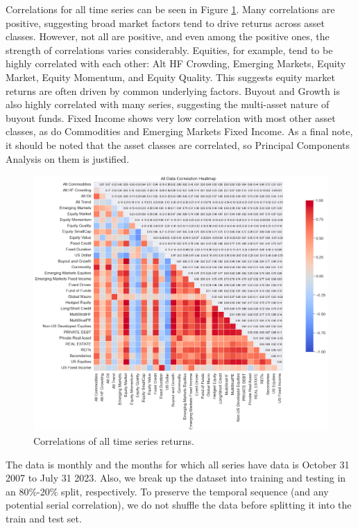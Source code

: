 \documentclass{ledger}
\begin{document}
Correlations for all time series can be seen in Figure \ref{fig:correlations}. Many correlations are positive, suggesting broad market factors tend to drive returns across asset classes. However, not all are positive, and even among the positive ones, the strength of correlations varies considerably. Equities, for example, tend to be highly correlated with each other: Alt HF Crowding, Emerging Markets, Equity Market, Equity Momentum, and Equity Quality. This suggests equity market returns are often driven by common underlying factors. Buyout and Growth is also highly correlated with many series, suggesting the multi-asset nature of buyout funds. Fixed Income shows very low correlation with most other asset classes, as do Commodities and Emerging Markets Fixed Income. As a final note, it should be noted that the asset classes are correlated, so Principal Components Analysis on them is justified. \\

\begin{figure}[!ht]
	\centering
	\includegraphics[width=430pt]{correlations.pdf}
	\parbox{430pt}{\caption{Correlations of all time series returns. \label{fig:correlations}}}
\end{figure}

The data is monthly and the months for which all series have data is October 31 2007 to July 31 2023. Also, we break up the dataset into training and testing in an 80\%-20\% split, respectively. To preserve the temporal sequence (and any potential serial correlation), we do not shuffle the data before splitting it into the train and test set. \\
\end{document}
